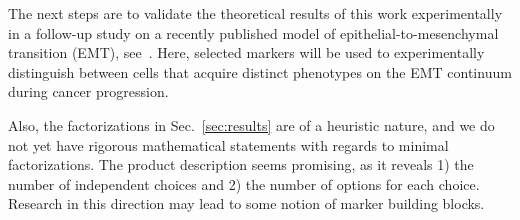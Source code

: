 \documentclass[11pt]{article}
\begin{document}
    The next steps are to validate the theoretical results of this work experimentally in a follow-up study on a recently published model of epithelial-to-mesenchymal transition (EMT), see~\cite{selvaggio2020hybrid}.
    Here, selected markers will be used to experimentally distinguish between cells that acquire distinct phenotypes on the EMT continuum during cancer progression.

    Also, the factorizations in Sec.~\ref{sec:results} are of a heuristic nature, and we do not yet have rigorous mathematical statements with regards to minimal factorizations.
    The product description seems promising, as it reveals 1) the number of independent choices and 2) the number of options for each choice.
    Research in this direction may lead to some notion of marker building blocks.

    
    
\end{document}
